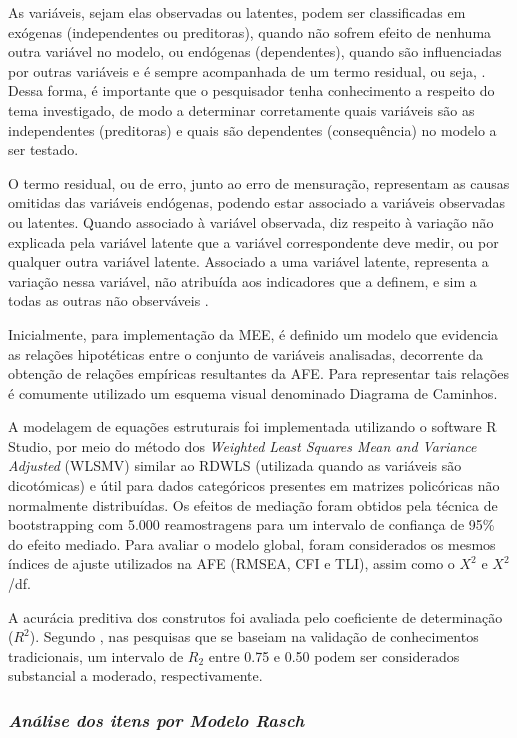 As variáveis, sejam elas observadas ou latentes, podem ser classificadas em exógenas (independentes ou preditoras), quando não sofrem efeito de nenhuma outra variável no modelo, ou endógenas (dependentes), quando são influenciadas por outras variáveis e é sempre acompanhada de um termo residual, ou seja, \cite{Iacobucci2010StructuralTopics}. Dessa forma, é importante que o pesquisador tenha conhecimento a respeito do tema investigado, de modo a determinar corretamente quais variáveis são as independentes (preditoras) e quais são dependentes (consequência) no modelo a ser testado. 

O termo residual, ou de erro, junto ao erro de mensuração, representam as causas omitidas das variáveis endógenas, podendo estar associado a variáveis observadas ou latentes. Quando associado à variável observada, diz respeito à variação não explicada pela variável latente que a variável correspondente deve medir, ou por qualquer outra variável latente. Associado a uma variável latente, representa a variação nessa variável, não atribuída aos indicadores que a definem, e sim a todas as outras não observáveis \cite{Iacobucci2009EverythingAsk}.

Inicialmente, para implementação da MEE, é definido um modelo que evidencia as relações hipotéticas entre o conjunto de variáveis analisadas, decorrente da obtenção de relações empíricas resultantes da AFE. Para representar tais relações é comumente utilizado um esquema visual denominado Diagrama de Caminhos.

A modelagem de equações estruturais foi implementada  utilizando o software R Studio, por meio do método dos \textit{Weighted Least Squares Mean and Variance Adjusted} (WLSMV) similar ao RDWLS (utilizada quando as variáveis são dicotómicas) e útil para dados categóricos presentes em matrizes policóricas não normalmente distribuídas. Os efeitos de mediação foram obtidos pela técnica de bootstrapping com 5.000 reamostragens para um intervalo de confiança de 95\% do efeito mediado. Para avaliar o modelo global, foram considerados os mesmos índices de ajuste utilizados na AFE (RMSEA, CFI e TLI), assim como o $X^2$ e $X^2$/df.

A acurácia preditiva dos construtos foi avaliada pelo coeficiente de determinação ($R^2$). Segundo , nas pesquisas que se baseiam na validação de conhecimentos tradicionais, um intervalo de $R_2$ entre 0.75 e 0.50 podem ser considerados substancial a moderado, respectivamente.

\subsubsection*{\textit{Análise dos itens por Modelo Rasch}}

